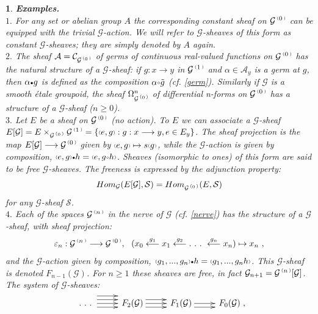 \documentclass[a4paper]{article}
\newtheorem{num}[st]{}
\newcommand{\rmap}{\longrightarrow}
\newcommand{\G}{\ensuremath{\mathcal{G}}}
\newcommand{\A}{\ensuremath{\mathcal{A}}}
\newcommand{\es}{\ensuremath{\mathcal{S}}}
\newcommand{\C}{\ensuremath{\mathcal{C}}}
\newcommand{\ps}{{\raise 1pt\hbox{\tiny (}}}
\newcommand{\pd}{{\raise 1pt\hbox{\tiny )}}}
\newcommand{\nG}[1]{\ensuremath{\G^{\,\ps #1\,\pd}}}
\def\cdot{{\raise 0.5pt\hbox{$\scriptscriptstyle\bullet$}}}
\def\compose{{\raise 1pt\hbox{$\scriptscriptstyle\circ$}}}
\begin{document}
\begin{num}
\label{ex2}
\emph{
{\bf Examples.}\\
\hspace*{.3in} $1.$ For any set or abelian group $A$ the corresponding constant sheaf on $\nG{0}$ can be equipped with the trivial $\G$-action. We will refer to $\G$-sheaves of this form as constant $\G$-sheaves; they are simply denoted by $A$ again.\\
\hspace*{.3in} $2.$ The sheaf $\A= \C_{\nG{0}}$ of germs of continuous real-valued functions on $\nG{0}$ has the natural structure of a $\G$-sheaf: if $g: x\rmap y$ in $\nG{1}$ and $\alpha \in \A_{y}$ is a germ at $g$, then $\alpha\cdot g$ is defined as the composition $\alpha \compose \tilde{g}$ (cf. \ref{germ}). Similarly if $\G$ is a smooth \'etale groupoid, the sheaf $\Omega^{n}_{\nG{0}}$ of differential n-forms on $\nG{0}$ has a structure of a $\G$-sheaf ($n \geq 0$).\\
\hspace*{.3in} $3.$ Let $E$ be a sheaf on $\nG{0}$ (no action). To $E$ we can associate a $\G$-sheaf $E[\G]= E \times_{\nG{0}} \nG{1}= \{ \ps e, g\pd : g: x \rmap y, e \in E_{y}\}$. The sheaf projection is the map $E[\G] \rmap \nG{0}$ given by $\ps e, g\pd \mapsto s\ps g\pd$, while the $\G$-action is given by composition, $\ps e, g\pd \cdot h= \ps e, g\compose h\pd$. Sheaves (isomorphic to ones) of this form are said to be free $\G$-sheaves. The freeness is expressed by the adjunction property:
\[ Hom_{\G}(E[\G], \es) = Hom_{\nG{0}}(E, \es) \]
for any $\G$-sheaf $\es$.\\
\hspace*{.3in} $4.$ Each of the spaces $\nG{n}$ in the nerve of $\G$ (cf. \ref{nerve}) has the structure of a $\G$-sheaf, with sheaf projection:
\[ \varepsilon_{n}: \nG{n} \rmap \nG{0}, \ \ (x_{0} \stackrel{g_{1}}{\longleftarrow} x_{1} \stackrel{g_{2}}{\longleftarrow} . \ . \ . \ \stackrel{g_{n}}{\longleftarrow} x_{n}) \mapsto x_{n} \ ,\]
and the $\G$-action given by composition, $\ps g_{1}, . . . , g_{n}\pd \cdot h= \ps g_{1}, . . . , g_{n}h\pd$. This $\G$-sheaf is denoted $F_{n-1}(\G)$. For $n \geq 1$ these sheaves are free, in fact $\G_{n+1}= \nG{n}[\G]$. The system of $\G$-sheaves: 
\begin{equation}
\label{rel2.1}
 \xymatrix {
 \  .\ .\ .\ \ar@<2ex>[r]\ar@<1ex>[r]\ar[r]\ar@<-1ex>[r] & \, F_{2}(\G) \ar@<1ex>[r]\ar[r]\ar@<-1ex>[r] & \,  F_{1}(\G) \ar[r]\ar@<-1ex>[r] & \,  F_{0}(\G)} ,
\end{equation}
}
\end{num}
\end{document}
